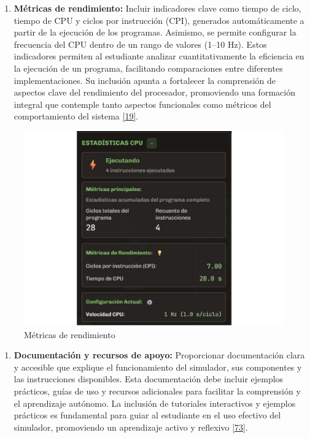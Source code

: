 \documentclass[12pt,oneside]{templates/unerthesis}
\providecommand{\tightlist}{%
  \setlength{\itemsep}{0pt}\setlength{\parskip}{0pt}}
\begin{document}
\begin{enumerate}
\def\labelenumi{\arabic{enumi}.}
\setcounter{enumi}{5}
\tightlist
\item
  \textbf{Métricas de rendimiento:}
  Incluir indicadores clave como tiempo de ciclo, tiempo de CPU y ciclos por instrucción (CPI), generados automáticamente a partir de la ejecución de los programas. Asimismo, se permite configurar la frecuencia del CPU dentro de un rango de valores (1--10 Hz). Estos indicadores permiten al estudiante analizar cuantitativamente la eficiencia en la ejecución de un programa, facilitando comparaciones entre diferentes implementaciones. Su inclusión apunta a fortalecer la comprensión de aspectos clave del rendimiento del procesador, promoviendo una formación integral que contemple tanto aspectos funcionales como métricos del comportamiento del sistema \protect\hyperlink{ref-hennessy2017computer}{{[}19{]}}.
\end{enumerate}

\begin{figure}

{\centering \includegraphics[width=0.85\linewidth]{images/metricas} 

}

\caption{Métricas de rendimiento}\label{fig:metricas}
\end{figure}

\begin{enumerate}
\def\labelenumi{\arabic{enumi}.}
\setcounter{enumi}{6}
\tightlist
\item
  \textbf{Documentación y recursos de apoyo:}
  Proporcionar documentación clara y accesible que explique el funcionamiento del simulador, sus componentes y las instrucciones disponibles. Esta documentación debe incluir ejemplos prácticos, guías de uso y recursos adicionales para facilitar la comprensión y el aprendizaje autónomo. La inclusión de tutoriales interactivos y ejemplos prácticos es fundamental para guiar al estudiante en el uso efectivo del simulador, promoviendo un aprendizaje activo y reflexivo \protect\hyperlink{ref-bonwell1991active}{{[}73{]}}.
\end{enumerate}
\end{document}
